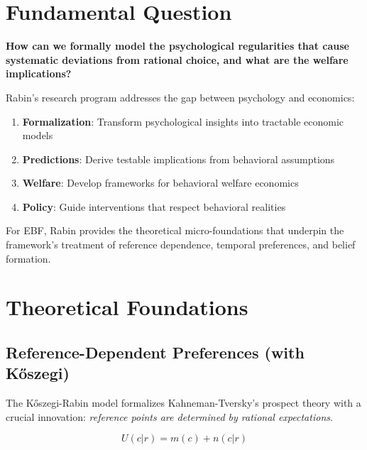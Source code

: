 \section{Fundamental Question}

\begin{tcolorbox}[colback=red!5!white,colframe=red!75!black,title=Central Question]
\textbf{How can we formally model the psychological regularities that cause systematic deviations from rational choice, and what are the welfare implications?}
\end{tcolorbox}

Rabin's research program addresses the gap between psychology and economics:

\begin{enumerate}
    \item \textbf{Formalization}: Transform psychological insights into tractable economic models
    \item \textbf{Predictions}: Derive testable implications from behavioral assumptions
    \item \textbf{Welfare}: Develop frameworks for behavioral welfare economics
    \item \textbf{Policy}: Guide interventions that respect behavioral realities
\end{enumerate}

For EBF, Rabin provides the theoretical micro-foundations that underpin the framework's treatment of reference dependence, temporal preferences, and belief formation.

\section{Theoretical Foundations}

\subsection{Reference-Dependent Preferences (with Kőszegi)}

The Kőszegi-Rabin model formalizes Kahneman-Tversky's prospect theory with a crucial innovation: \textit{reference points are determined by rational expectations}.

\begin{equation}
U(c|r) = m(c) + n(c|r)
\end{equation}

